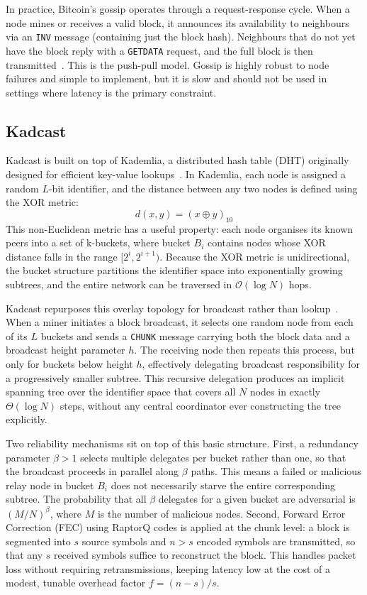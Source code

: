 \documentclass{article}
\begin{document}
In practice, Bitcoin's gossip operates through a request-response cycle. When a node mines or receives a valid block, it announces its availability to neighbours via an \texttt{INV} message (containing just the block hash). Neighbours that do not yet have the block reply with a \texttt{GETDATA} request, and the full block is then transmitted~\cite{deckerInformationPropagationBitcoin2013}. This is the push-pull model. Gossip is highly robust to node failures and simple to implement, but it is slow and should not be used in settings where latency is the primary constraint.


\subsection{Kadcast}
Kadcast is built on top of Kademlia, a distributed hash table (DHT) originally designed for efficient key-value lookups~\cite{maymounkovKademliaPeertoPeerInformation2002}. In Kademlia, each node is assigned a random $L$-bit identifier, and the distance between any two nodes is defined using the XOR metric: 
\[ d(x, y) = (x \oplus y)_{10} \]
This non-Euclidean metric has a useful property: each node organises its known peers into a set of k-buckets, where bucket $B_i$ contains nodes whose XOR distance falls in the range $[2^i, 2^{i+1})$. Because the XOR metric is unidirectional, the bucket structure partitions the identifier space into exponentially growing subtrees, and the entire network can be traversed in $\mathcal{O}{(\log N)}$ hops.

Kadcast repurposes this overlay topology for broadcast rather than lookup~\cite{rohrerKadcastStructuredApproach2019}. When a miner initiates a block broadcast, it selects one random node from each of its $L$ buckets and sends a \texttt{CHUNK} message carrying both the block data and a broadcast height parameter $h$. The receiving node then repeats this process, but only for buckets below height $h$, effectively delegating broadcast responsibility for a progressively smaller subtree. This recursive delegation produces an implicit spanning tree over the identifier space that covers all $N$ nodes in exactly $\Theta{(\log N)}$ steps, without any central coordinator ever constructing the tree explicitly.

Two reliability mechanisms sit on top of this basic structure. First, a redundancy parameter $\beta > 1$ selects multiple delegates per bucket rather than one, so that the broadcast proceeds in parallel along $\beta$ paths. This means a failed or malicious relay node in bucket $B_i$ does not necessarily starve the entire corresponding subtree. The probability that all $\beta$ delegates for a given bucket are adversarial is $(M/N)^\beta$, where $M$ is the number of malicious nodes. Second, Forward Error Correction (FEC) using RaptorQ codes is applied at the chunk level: a block is segmented into $s$ source symbols and $n > s$ encoded symbols are transmitted, so that any $s$ received symbols suffice to reconstruct the block. This handles packet loss without requiring retransmissions, keeping latency low at the cost of a modest, tunable overhead factor $f = (n - s)/s$.
\end{document}
